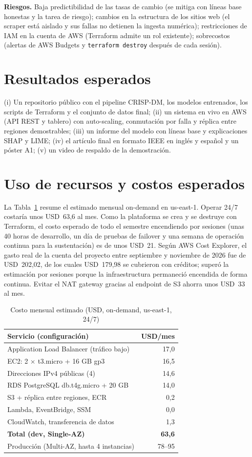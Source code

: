 \documentclass[conference]{IEEEtran}
\begin{document}
\textbf{Riesgos.} Baja predictibilidad de las tasas de cambio (se mitiga con líneas base honestas y la tarea de riesgo); cambios en la estructura de los sitios web (el scraper está aislado y sus fallas no detienen la ingesta numérica); restricciones de IAM en la cuenta de AWS (Terraform admite un rol existente); sobrecostos (alertas de AWS Budgets y \texttt{terraform destroy} después de cada sesión).

\section{Resultados esperados}
(i) Un repositorio público con el pipeline CRISP-DM, los modelos entrenados, los scripts de Terraform y el conjunto de datos final; (ii) un sistema en vivo en AWS (API REST y tablero) con auto-scaling, conmutación por falla y réplica entre regiones demostrables; (iii) un informe del modelo con líneas base y explicaciones SHAP y LIME; (iv) el artículo final en formato IEEE en inglés y español y un póster A1; (v) un video de respaldo de la demostración.

\section{Uso de recursos y costos esperados}
La Tabla~\ref{tab:cost} resume el estimado mensual on-demand en us-east-1. Operar 24/7 costaría unos USD~63,6 al mes. Como la plataforma se crea y se destruye con Terraform, el costo esperado de todo el semestre encendiendo por sesiones (unas 40 horas de desarrollo, un día de pruebas de failover y una semana de operación continua para la sustentación) es de unos USD~21. Según AWS Cost Explorer, el gasto real de la cuenta del proyecto entre septiembre y noviembre de 2026 fue de USD~202,02, de los cuales USD~179,98 se cubrieron con créditos; superó la estimación por sesiones porque la infraestructura permaneció encendida de forma continua. Evitar el NAT gateway gracias al endpoint de S3 ahorra unos USD~33 al mes.

\begin{table}[t]
\caption{Costo mensual estimado (USD, on-demand, us-east-1, 24/7)}
\label{tab:cost}
\centering
\begin{tabular}{@{}lr@{}}
\toprule
Servicio (configuración) & USD/mes \\
\midrule
Application Load Balancer (tráfico bajo) & 17,0 \\
EC2: 2 $\times$ t3.micro + 16 GB gp3 & 16,5 \\
Direcciones IPv4 públicas (4) & 14,6 \\
RDS PostgreSQL db.t4g.micro + 20 GB & 14,0 \\
S3 + réplica entre regiones, ECR & 0,2 \\
Lambda, EventBridge, SSM & 0,0 \\
CloudWatch, transferencia de datos & 1,3 \\
\midrule
\textbf{Total (dev, Single-AZ)} & \textbf{63,6} \\
Producción (Multi-AZ, hasta 4 instancias) & 78--95 \\
\bottomrule
\end{tabular}
\end{table}
\end{document}
